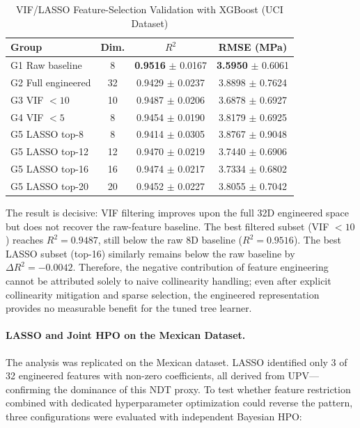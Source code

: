 \documentclass[journal]{IEEEtran}
\begin{document}
\begin{table}[!t]
\renewcommand{\arraystretch}{1.15}
\caption{VIF/LASSO Feature-Selection Validation with XGBoost (UCI Dataset)}
\label{tab:feature_selection}
\centering
\begin{tabular}{lccc}
\toprule
\textbf{Group} & \textbf{Dim.} & \textbf{$R^2$} & \textbf{RMSE (MPa)} \\
\midrule
G1 Raw baseline & 8  & \textbf{0.9516} $\pm$ 0.0167 & \textbf{3.5950} $\pm$ 0.6061 \\
G2 Full engineered & 32 & 0.9429 $\pm$ 0.0237 & 3.8898 $\pm$ 0.7624 \\
G3 VIF $<10$ & 10 & 0.9487 $\pm$ 0.0206 & 3.6878 $\pm$ 0.6927 \\
G4 VIF $<5$ & 8 & 0.9454 $\pm$ 0.0190 & 3.8179 $\pm$ 0.6925 \\
G5 LASSO top-8 & 8 & 0.9414 $\pm$ 0.0305 & 3.8767 $\pm$ 0.9048 \\
G5 LASSO top-12 & 12 & 0.9470 $\pm$ 0.0219 & 3.7440 $\pm$ 0.6906 \\
G5 LASSO top-16 & 16 & 0.9474 $\pm$ 0.0217 & 3.7334 $\pm$ 0.6802 \\
G5 LASSO top-20 & 20 & 0.9452 $\pm$ 0.0227 & 3.8055 $\pm$ 0.7042 \\
\bottomrule
\end{tabular}
\end{table}

The result is decisive: VIF filtering improves upon the full 32D engineered space but does not recover the raw-feature baseline. The best filtered subset (VIF $<10$) reaches $R^2=0.9487$, still below the raw 8D baseline ($R^2=0.9516$). The best LASSO subset (top-16) similarly remains below the raw baseline by $\Delta R^2=-0.0042$. Therefore, the negative contribution of feature engineering cannot be attributed solely to naive collinearity handling; even after explicit collinearity mitigation and sparse selection, the engineered representation provides no measurable benefit for the tuned tree learner.

\paragraph{LASSO and Joint HPO on the Mexican Dataset.} The analysis was replicated on the Mexican dataset. LASSO identified only 3 of 32 engineered features with non-zero coefficients, all derived from UPV---confirming the dominance of this NDT proxy. To test whether feature restriction combined with dedicated hyperparameter optimization could reverse the pattern, three configurations were evaluated with independent Bayesian HPO:
\end{document}
